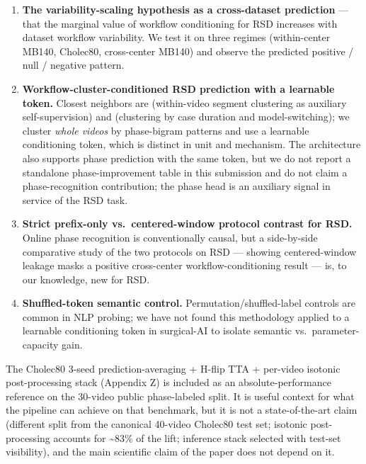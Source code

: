 \begin{enumerate}
\def\labelenumi{\arabic{enumi}.}
\tightlist
\item
  \textbf{The variability-scaling hypothesis as a cross-dataset
  prediction} --- that the marginal value of workflow
  conditioning for RSD increases with dataset workflow variability. We
  test it on three regimes (within-center MB140, Cholec80, cross-center
  MB140) and observe the predicted positive / null / negative pattern.
\item
  \textbf{Workflow-cluster-conditioned RSD prediction with a learnable
  token.} Closest neighbors are \citet{yengera2019unsupervised} (within-video
  segment clustering as auxiliary self-supervision) and \citet{kostopoulos2025prediction} (clustering by case duration and model-switching); we
  cluster \emph{whole videos} by phase-bigram patterns and use a
  learnable conditioning token, which is distinct in unit and mechanism.
  The architecture also supports phase prediction with the same token,
  but we do not report a standalone phase-improvement table in this
  submission and do not claim a phase-recognition contribution; the
  phase head is an auxiliary signal in service of the RSD task.
\item
  \textbf{Strict prefix-only vs.~centered-window protocol contrast for
  RSD.} Online phase recognition is conventionally causal, but a
  side-by-side comparative study of the two protocols on RSD --- showing
  centered-window leakage masks a positive cross-center
  workflow-conditioning result --- is, to our knowledge, new for RSD.
\item
  \textbf{Shuffled-token semantic control.} Permutation/shuffled-label
  controls are common in NLP probing; we have not found this methodology
  applied to a learnable conditioning token in surgical-AI to isolate
  semantic vs.~parameter-capacity gain.
\end{enumerate}

The Cholec80 3-seed prediction-averaging + H-flip TTA + per-video
isotonic post-processing stack (Appendix Z) is included as an
absolute-performance reference on the 30-video public phase-labeled
split. It is useful context for what the pipeline can achieve on that
benchmark, but it is not a state-of-the-art claim (different split from
the canonical 40-video Cholec80 test set; isotonic post-processing
accounts for \textasciitilde83\% of the lift; inference stack selected
with test-set visibility), and the main scientific claim of the paper
does not depend on it.

